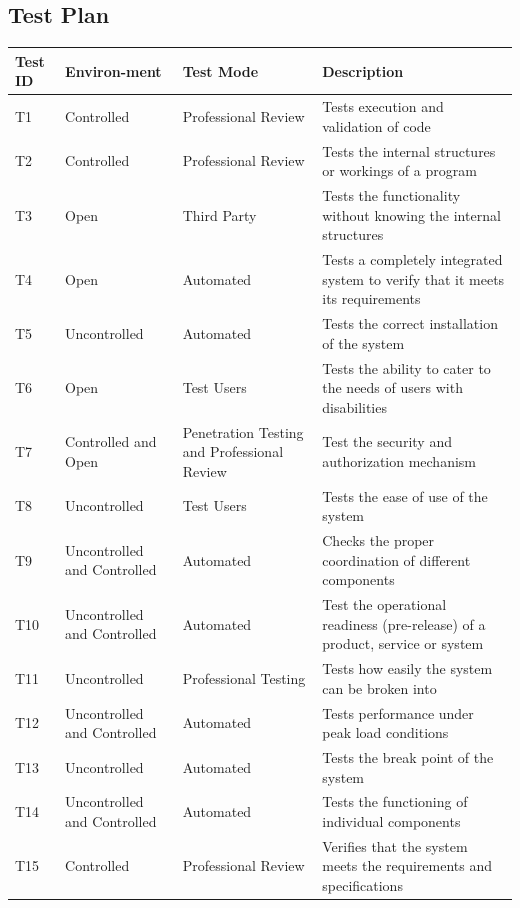 \documentclass[a4paper,twoside,phd]{BYUPhys}
\begin{document}
\subsection{Test Plan}
\setlength{\arrayrulewidth}{0.2mm}
\setlength{\tabcolsep}{18pt}
\renewcommand{\arraystretch}{2.5}
 
{
\begin{longtable}{ |p{2cm}|p{2cm}|p{2cm}|p{5cm}|  }
\hline
\bf{Test ID} & \bf{Environ-ment} & \bf{Test Mode} & \bf{Description}\\
\hline
T1 & Controlled  & Professional Review  &  Tests execution and validation of code \\
T2 & Controlled  & Professional Review  &  Tests the internal structures or workings of a program \\
T3 & Open  & Third Party  &  Tests the functionality without knowing the internal structures \\
T4 & Open  & Automated  &  Tests a completely integrated system to verify that it meets its requirements \\
T5 & Uncontrolled  & Automated  &  Tests the correct installation of the system \\
T6 & Open  & Test Users  &  Tests the ability to cater to the needs of users with disabilities \\
T7 & Controlled and Open  & Penetration Testing and Professional Review  &  Test the security and authorization mechanism \\
T8 & Uncontrolled  & Test Users  &  Tests the ease of use of the system \\
T9 & Uncontrolled and Controlled  & Automated  &  Checks the proper coordination of different components \\
T10 & Uncontrolled and Controlled  & Automated &  Test the operational readiness (pre-release) of a product, service or system \\
T11 & Uncontrolled  & Professional Testing  &  Tests how easily the system can be broken into \\
T12 & Uncontrolled and Controlled  & Automated  &  Tests performance under peak load conditions \\
T13 & Uncontrolled  & Automated  &  Tests the break point of the system \\
T14 & Uncontrolled and Controlled  & Automated  &  Tests the functioning of individual components \\
T15 & Controlled  & Professional Review  &  Verifies that the system meets the requirements and specifications \\
\hline
\end{longtable}
}
\end{document}
